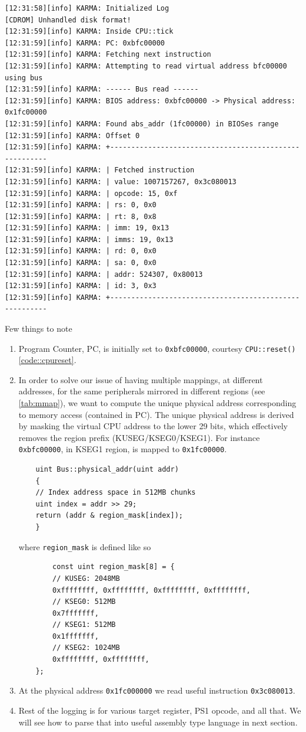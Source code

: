 \documentclass[a4paper]{article}
\newcommand{\code}[1] {\texttt{#1}}
\begin{document}
\begin{verbatim}
[12:31:58][info] KARMA: Initialized Log
[CDROM] Unhandled disk format!
[12:31:59][info] KARMA: Inside CPU::tick
[12:31:59][info] KARMA: PC: 0xbfc00000
[12:31:59][info] KARMA: Fetching next instruction
[12:31:59][info] KARMA: Attempting to read virtual address bfc00000 using bus
[12:31:59][info] KARMA: ------ Bus read ------
[12:31:59][info] KARMA: BIOS address: 0xbfc00000 -> Physical address: 0x1fc00000
[12:31:59][info] KARMA: Found abs_addr (1fc00000) in BIOSes range
[12:31:59][info] KARMA: Offset 0
[12:31:59][info] KARMA: +-------------------------------------------------------
[12:31:59][info] KARMA: | Fetched instruction 
[12:31:59][info] KARMA: | value: 1007157267, 0x3c080013
[12:31:59][info] KARMA: | opcode: 15, 0xf
[12:31:59][info] KARMA: | rs: 0, 0x0
[12:31:59][info] KARMA: | rt: 8, 0x8
[12:31:59][info] KARMA: | imm: 19, 0x13
[12:31:59][info] KARMA: | imms: 19, 0x13
[12:31:59][info] KARMA: | rd: 0, 0x0
[12:31:59][info] KARMA: | sa: 0, 0x0
[12:31:59][info] KARMA: | addr: 524307, 0x80013
[12:31:59][info] KARMA: | id: 3, 0x3
[12:31:59][info] KARMA: +-------------------------------------------------------
\end{verbatim}

Few things to note

\begin{enumerate}
\item Program Counter, PC, is initially set to \code{0xbfc00000}, courtesy \code{CPU::reset()}
  \ref{code::cpureset}.
\item\label{mirrorresolve} In order to solve our issue of having multiple mappings, at different addresses,
  for the same peripherals mirrored in different regions (see \ref{tab:mmap}), we want to compute the unique
  physical address corresponding to memory access (contained in PC).  The unique physical address is
  derived by masking the virtual CPU address to the lower 29 bits, which effectively removes the
  region prefix (KUSEG/KSEG0/KSEG1).  For instance \code{0xbfc00000}, in KSEG1 region, is mapped to
  \code{0x1fc00000}.
  \begin{lstlisting}
    uint Bus::physical_addr(uint addr)
    {
	// Index address space in 512MB chunks
	uint index = addr >> 29;
	return (addr & region_mask[index]);
    }
  \end{lstlisting}
  where \code{region\_mask} is defined like so
  \begin{lstlisting}
    	const uint region_mask[8] = {
		// KUSEG: 2048MB
		0xffffffff, 0xffffffff, 0xffffffff, 0xffffffff,
		// KSEG0: 512MB
		0x7fffffff,
		// KSEG1: 512MB
		0x1fffffff,
		// KSEG2: 1024MB
		0xffffffff, 0xffffffff,
	};
      \end{lstlisting}
\item At the physical address \code{0x1fc000000} we read useful instruction
  \code{0x3c080013}.
\item Rest of the logging is for various target register, PS1 opcode, and all that.  We
  will see how to parse that into useful assembly type language in next section.
\end{enumerate}
\end{document}

